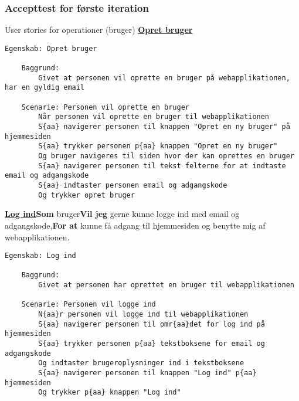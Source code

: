 
\subsubsection{Accepttest for første iteration}

\noindent User stories for operationer (bruger)\newline
\textbf{\underline{Opret bruger}}

\begin{lstlisting}[language=Gherkin]
Egenskab: Opret bruger
    
    Baggrund:
        Givet at personen vil oprette en bruger på webapplikationen, har en gyldig email
        
	Scenarie: Personen vil oprette en bruger
		Når personen vil oprette en bruger til webapplikationen
		S{aa} navigerer personen til knappen "Opret en ny bruger" på hjemmesiden
		S{aa} trykker personen p{aa} knappen "Opret en ny bruger"
		Og bruger navigeres til siden hvor der kan oprettes en bruger
		S{aa} navigerer personen til tekst felterne for at indtaste email og adgangskode
		S{aa} indtaster personen email og adgangskode
		Og trykker opret bruger
\end{lstlisting}

\newline\textbf{\underline{Log ind}}\newline \textbf{Som} bruger\newline \textbf{Vil jeg} gerne kunne logge ind med email og adgangskode,\newline \textbf{For at} kunne få adgang til hjemmesiden og benytte mig af webapplikationen.\newline

\begin{lstlisting}[language=Gherkin]
Egenskab: Log ind
    
    Baggrund:
        Givet at personen har oprettet en bruger til webapplikationen
        
	Scenarie: Personen vil logge ind
		N{aa}r personen vil logge ind til webapplikationen
		S{aa} navigerer personen til omr{aa}det for log ind på hjemmesiden
		S{aa} trykker personen p{aa} tekstboksene for email og adgangskode
		Og indtaster brugeroplysninger ind i tekstboksene 
		S{aa} navigerer personen til knappen "Log ind" p{aa} hjemmesiden
		Og trykker p{aa} knappen "Log ind"
\end{lstlisting}
